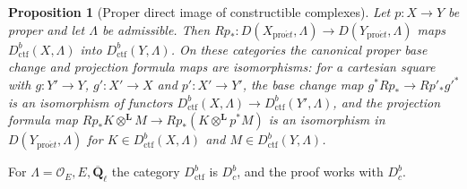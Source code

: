 \documentclass[11pt,a4paper]{article}
\numberwithin{equation}{section}
\newtheorem{proposition}[theorem]{Proposition}
\theoremstyle{definition}
\theoremstyle{remark}
\newcommand{\D}{D}
\newcommand{\Dbc}{D^b_c}
\newcommand{\Qbar}{\overline{\mathbf Q}_\ell}
\newcommand{\proet}{\mathrm{pro}\acute{e}t}
\newcommand{\Dctf}{D^b_{\mathrm{ctf}}}
\begin{document}
\begin{proposition}[Proper direct image of constructible complexes]
\label{b:prop:proper-coefficients}
Let $p:X\to Y$ be proper and let $\Lambda$ be admissible. Then
$Rp_*\colon\D(X_{\proet},\Lambda)\to\D(Y_{\proet},\Lambda)$ maps
$\Dctf(X,\Lambda)$ into $\Dctf(Y,\Lambda)$. On these categories the
canonical proper base change and projection formula maps are
isomorphisms: for a cartesian square with $g:Y'\to Y$, $g':X'\to X$ and
$p':X'\to Y'$, the base change map $g^*Rp_*\to Rp'_*g'^*$ is an
isomorphism of functors $\Dctf(X,\Lambda)\to\Dctf(Y',\Lambda)$, and the
projection formula map
$Rp_*K\otimes^{\mathbf L}M\to Rp_*(K\otimes^{\mathbf L}p^*M)$ is an
isomorphism in $\D(Y_{\proet},\Lambda)$ for $K\in\Dctf(X,\Lambda)$ and
$M\in\Dctf(Y,\Lambda)$.
\end{proposition}
For $\Lambda=\mathcal O_E,E,\Qbar$ the category $\Dctf$ is $\Dbc$, and
the proof works with $\Dbc$.
\end{document}
